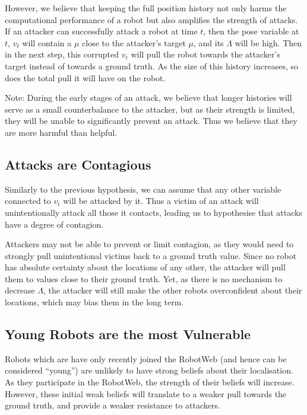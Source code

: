 However, we believe that keeping the full position history not only harms the computational performance of a robot but also amplifies the strength of attacks. If an attacker can successfully attack a robot at time $t$, then the pose variable at $t$, $v_t$ will contain a $\mu$ close to the attacker's target $\mu$, and its $\Lambda$ will be high. Then in the next step, this corrupted $v_t$ will pull the robot towards the attacker's target instead of towards a ground truth. As the size of this history increases, so does the total pull it will have on the robot.

Note: During the early stages of an attack, we believe that longer histories will serve as a small counterbalance to the attacker, but as their strength is limited, they will be unable to significantly prevent an attack. Thus we believe that they are more harmful than helpful.

\subsection{Attacks are Contagious} \label{hyp:contagion} %
Similarly to the previous hypothesis, we can assume that any other variable connected to $v_t$ will be attacked by it. Thus a victim of an attack will unintentionally attack all those it contacts, leading us to hypothesise that attacks have a degree of contagion. 

Attackers may not be able to prevent or limit contagion, as they would need to strongly pull unintentional victims back to a ground truth value. Since no robot has absolute certainty about the locations of any other, the attacker will pull them to values close to their ground truth. Yet, as there is no mechanism to decrease $\Lambda$, the attacker will still make the other robots overconfident about their locations, which may bias them in the long term.

\subsection{Young Robots are the most Vulnerable} \label{hyp:startup_vuln}
Robots which are have only recently joined the RobotWeb (and hence can be considered ``young'') are unlikely to have strong beliefs about their localisation. As they participate in the RobotWeb, the strength of their beliefs will increase. However, these initial weak beliefs will translate to a weaker pull towards the ground truth, and provide a weaker resistance to attackers.

